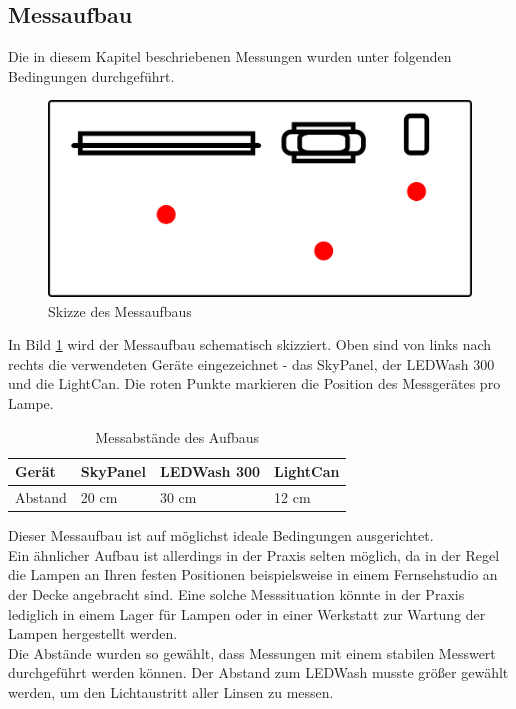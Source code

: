 \documentclass[11pt]{scrartcl}
\begin{document}
\subsection{Messaufbau}
Die in diesem Kapitel beschriebenen Messungen wurden unter folgenden Bedingungen durchgeführt.
\begin{figure}[H]
    \begin{center}
        \includegraphics[width=.8\textwidth]{images/meassureScenario.png}
    \end{center}
    \caption{Skizze des Messaufbaus} \label{fig:measureScribble}
\end{figure}
\noindent
In Bild \ref{fig:measureScribble} wird der Messaufbau schematisch skizziert. Oben sind von links nach rechts die verwendeten Geräte eingezeichnet -
das SkyPanel, der LEDWash 300 und die LightCan. Die roten Punkte markieren die Position des Messgerätes pro Lampe.
\begin{table}[H]
    \begin{tabularx}{\textwidth}{|l|X|X|X|}
        \hline Gerät  & SkyPanel & LEDWash 300 & LightCan\\\hline
        Abstand       & 20 cm    & 30 cm       & 12 cm   \\\hline
    \end{tabularx}
    \caption{Messabstände des Aufbaus}
\end{table}
\noindent
Dieser Messaufbau ist auf möglichst ideale Bedingungen ausgerichtet.\\
Ein ähnlicher Aufbau ist allerdings in der Praxis selten möglich, da in der Regel die Lampen an Ihren festen Positionen beispielsweise in einem
Fernsehstudio an der Decke angebracht sind. Eine solche Messsituation könnte in der Praxis lediglich in einem Lager für Lampen oder in einer
Werkstatt zur Wartung der Lampen hergestellt werden.\\
Die Abstände wurden so gewählt, dass Messungen mit einem stabilen Messwert durchgeführt werden können. Der Abstand zum LEDWash musste größer
gewählt werden, um den Lichtaustritt aller Linsen zu messen.\\
\end{document}

